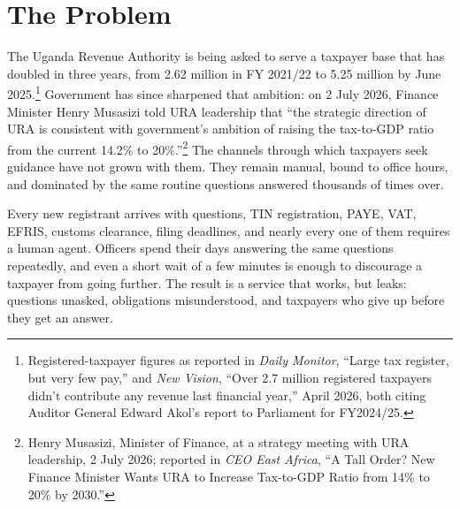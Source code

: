 \documentclass[11pt,a4paper]{article}
\begin{document}
\section{The Problem}

The Uganda Revenue Authority is being asked to serve a taxpayer base that has doubled in three years, from 2.62 million in FY 2021/22 to 5.25 million by June 2025.\footnote{Registered-taxpayer figures as reported in \textit{Daily Monitor}, ``Large tax register, but very few pay,'' and \textit{New Vision}, ``Over 2.7 million registered taxpayers didn't contribute any revenue last financial year,'' April 2026, both citing Auditor General Edward Akol's report to Parliament for FY2024/25.} Government has since sharpened that ambition: on 2 July 2026, Finance Minister Henry Musasizi told URA leadership that ``the strategic direction of URA is consistent with government's ambition of raising the tax-to-GDP ratio from the current 14.2\% to 20\%.''\footnote{Henry Musasizi, Minister of Finance, at a strategy meeting with URA leadership, 2 July 2026; reported in \textit{CEO East Africa}, ``A Tall Order? New Finance Minister Wants URA to Increase Tax-to-GDP Ratio from 14\% to 20\% by 2030.''} The channels through which taxpayers seek guidance have not grown with them. They remain manual, bound to office hours, and dominated by the same routine questions answered thousands of times over.

Every new registrant arrives with questions, TIN registration, PAYE, VAT, EFRIS, customs clearance, filing deadlines, and nearly every one of them requires a human agent. Officers spend their days answering the same questions repeatedly, and even a short wait of a few minutes is enough to discourage a taxpayer from going further. The result is a service that works, but leaks: questions unasked, obligations misunderstood, and taxpayers who give up before they get an answer.
\end{document}
